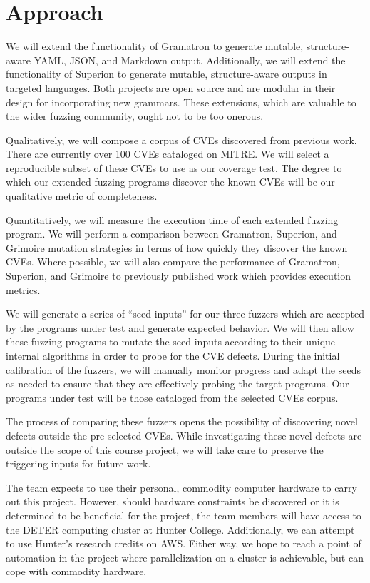 \documentclass[12pt]{diazessay}
\begin{document}

\section*{Approach}

We will extend the functionality of Gramatron to generate mutable, structure-aware YAML, JSON, and Markdown output.
Additionally, we will extend the functionality of Superion to generate mutable, structure-aware outputs in targeted languages.
Both projects are open source and are modular in their design for incorporating new grammars.
These extensions, which are valuable to the wider fuzzing community, ought not to be too onerous.

Qualitatively, we will compose a corpus of CVEs discovered from previous work.
There are currently over 100 CVEs cataloged on MITRE\cite{MITRE}.
We will select a reproducible subset of these CVEs to use as our coverage test.
The degree to which our extended fuzzing programs discover the known CVEs will be our qualitative metric of completeness.

Quantitatively, we will measure the execution time of each extended fuzzing program.
We will perform a comparison between Gramatron, Superion, and Grimoire mutation strategies in terms of how quickly they discover the known CVEs.
Where possible, we will also compare the performance of Gramatron, Superion, and Grimoire to previously published work which provides execution metrics.

We will generate a series of ``seed inputs'' for our three fuzzers which are accepted by the programs under test and generate expected behavior.
We will then allow these fuzzing programs to mutate the seed inputs\cite{Seed} according to their unique internal algorithms in order to probe for the CVE defects.
During the initial calibration of the fuzzers, we will manually monitor progress and adapt the seeds as needed to ensure that they are effectively probing the target programs.
Our programs under test will be those cataloged from the selected CVEs corpus.

The process of comparing these fuzzers opens the possibility of discovering novel defects outside the pre-selected CVEs.
While investigating these novel defects are outside the scope of this course project, we will take care to preserve the triggering inputs for future work.

The team expects to use their personal, commodity computer hardware to carry out this project.
However, should hardware constraints be discovered or it is determined to be beneficial for the project, the team members will have access to the DETER computing cluster at Hunter College.
Additionally, we can attempt to use Hunter's research credits on AWS.
Either way, we hope to reach a point of automation in the project where parallelization on a cluster is achievable, but can cope with commodity hardware.
\end{document}
